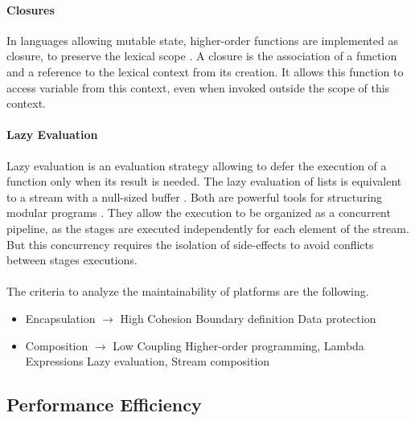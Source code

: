 \paragraph{Closures}
In languages allowing mutable state, higher-order functions are implemented as closure, to preserve the lexical scope \cite{Sussman1998}.
A closure is the association of a function and a reference to the lexical context from its creation.
It allows this function to access variable from this context, even when invoked outside the scope of this context.

\paragraph{Lazy Evaluation}
Lazy evaluation is an evaluation strategy allowing to defer the execution of a function only when its result is needed.
The lazy evaluation of lists is equivalent to a stream with a null-sized buffer \cite{VanRoy2003}. %
Both are powerful tools for structuring modular programs \cite{Sussman1983}.
They allow the execution to be organized as a concurrent pipeline, as the stages are executed independently for each element of the stream.
But this concurrency requires the isolation of side-effects to avoid conflicts between stages executions.




\paragraph{}

The criteria to analyze the maintainability of platforms are the following.

\begin{itemize}
\item Encapsulation $\to$ High Cohesion
  \subitem Boundary definition
  \subitem Data protection
\item Composition $\to$ Low Coupling
  \subitem Higher-order programming, Lambda Expressions
  \subitem Lazy evaluation, Stream composition
\end{itemize}


\subsection{Performance Efficiency}

